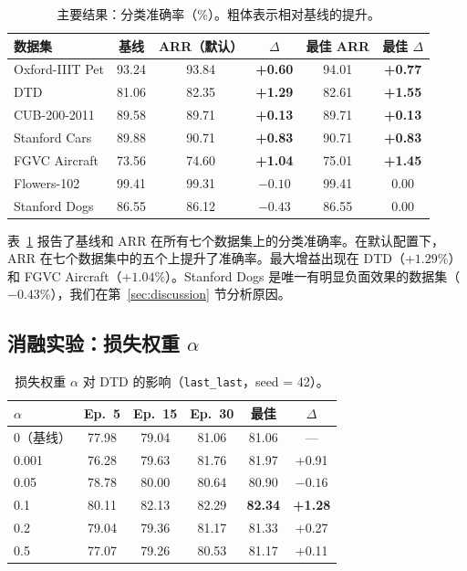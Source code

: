 \documentclass[preprint,12pt]{elsarticle}
\begin{document}
\begin{table}[t]
\centering
\caption{主要结果：分类准确率（\%）。粗体表示相对基线的提升。}\label{tab:main}
\begin{tabular}{lccccc}
\toprule
数据集 & 基线 & ARR（默认） & $\Delta$ & 最佳 ARR & 最佳 $\Delta$ \\
\midrule
Oxford-IIIT Pet & 93.24 & 93.84 & \textbf{+0.60} & 94.01 & \textbf{+0.77} \\
DTD & 81.06 & 82.35 & \textbf{+1.29} & 82.61 & \textbf{+1.55} \\
CUB-200-2011 & 89.58 & 89.71 & \textbf{+0.13} & 89.71 & \textbf{+0.13} \\
Stanford Cars & 89.88 & 90.71 & \textbf{+0.83} & 90.71 & \textbf{+0.83} \\
FGVC Aircraft & 73.56 & 74.60 & \textbf{+1.04} & 75.01 & \textbf{+1.45} \\
Flowers-102 & 99.41 & 99.31 & $-0.10$ & 99.41 & $0.00$ \\
Stanford Dogs & 86.55 & 86.12 & $-0.43$ & 86.55 & $0.00$ \\
\bottomrule
\end{tabular}
\end{table}

表~\ref{tab:main} 报告了基线和 ARR 在所有七个数据集上的分类准确率。在默认配置下，ARR 在七个数据集中的五个上提升了准确率。最大增益出现在 DTD（$+1.29\%$）和 FGVC Aircraft（$+1.04\%$）。Stanford Dogs 是唯一有明显负面效果的数据集（$-0.43\%$），我们在第~\ref{sec:discussion} 节分析原因。

\subsection{消融实验：损失权重 $\alpha$}

\begin{table}[t]
\centering
\caption{损失权重 $\alpha$ 对 DTD 的影响（\texttt{last\_last}，seed = 42）。}\label{tab:alpha}
\begin{tabular}{lccccc}
\toprule
$\alpha$ & Ep.~5 & Ep.~15 & Ep.~30 & 最佳 & $\Delta$ \\
\midrule
0（基线） & 77.98 & 79.04 & 81.06 & 81.06 & --- \\
0.001 & 76.28 & 79.63 & 81.76 & 81.97 & +0.91 \\
0.05 & 78.78 & 80.00 & 80.64 & 80.90 & $-0.16$ \\
0.1 & 80.11 & 82.13 & 82.29 & \textbf{82.34} & \textbf{+1.28} \\
0.2 & 79.04 & 79.36 & 81.17 & 81.33 & +0.27 \\
0.5 & 77.07 & 79.26 & 80.53 & 81.17 & +0.11 \\
\bottomrule
\end{tabular}
\end{table}
\end{document}
